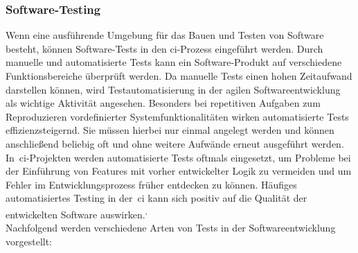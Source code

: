 \subsubsection{Software-Testing}

Wenn eine ausführende Umgebung für das Bauen und Testen von Software besteht, können Software-Tests in den
\acrshort{ci}-Prozess eingeführt werden.
Durch manuelle und automatisierte Tests kann ein Software-Produkt auf verschiedene Funktionsbereiche überprüft werden.
Da manuelle Tests einen hohen Zeitaufwand darstellen können, wird Testautomatisierung in der agilen Softwareentwicklung
als wichtige Aktivität angesehen.
Besonders bei repetitiven Aufgaben zum Reproduzieren vordefinierter Systemfunktionalitäten wirken automatisierte
Tests effizienzsteigernd.
Sie müssen hierbei nur einmal angelegt werden und können anschließend beliebig oft und ohne weitere Aufwände erneut
ausgeführt werden.
In\ \acrshort{ci}-Projekten werden automatisierte Tests oftmals eingesetzt, um Probleme bei der
Einführung von Features mit vorher entwickelter Logik zu vermeiden und um Fehler im Entwicklungsprozess früher
entdecken zu können.
Häufiges automatisiertes Testing in der\ \acrshort{ci} kann sich positiv auf die Qualität der entwickelten Software
auswirken.\textsuperscript{,\ }
\\
Nachfolgend werden verschiedene Arten von Tests in der Softwareentwicklung vorgestellt:

